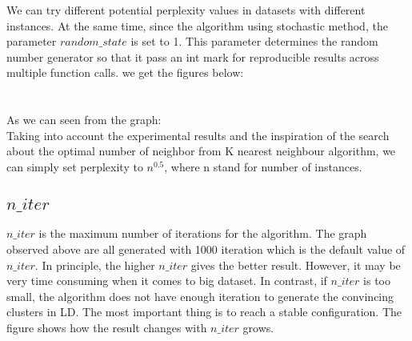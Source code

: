 \noindent We can try different potential perplexity values in datasets with different instances. At the same time, since the algorithm using stochastic method, the parameter $random\_state$ is set to 1. This parameter determines the random number generator so that it pass an int mark for reproducible results across multiple function calls. we get the figures below:\\
\\
\\

As we can seen from the graph:\\


\noindent Taking into account the experimental results and the inspiration of the search about the optimal number of neighbor from K nearest neighbour algorithm\cite{ref12}, we can simply set perplexity to $n^{0.5}$, where n stand for number of instances.\\


\subsection{$n\_iter$}

$n\_iter$ is the maximum number of iterations for the algorithm. The graph observed above are all generated with 1000 iteration which is the default value of $n\_iter$. In principle, the higher $n\_iter$ gives the better result. However, it may be very time consuming when it comes to big dataset. In contrast, if $n\_iter$ is too small, the algorithm does not have enough iteration to generate the convincing clusters in LD. The most important thing is to reach a stable configuration. The figure shows how the result changes with $n\_iter$ grows.



